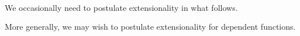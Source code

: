 \begin{fence}
\begin{code}%
\>[0]\AgdaSpace{}%
\AgdaSymbol{:}\AgdaSpace{}%
\AgdaSpace{}%
\AgdaSpace{}%
\AgdaOperator{\AgdaPrimitive{\AgdaUnderscore{}+\AgdaUnderscore{}}}\<%
\\
\>[0]\AgdaSpace{}%
\AgdaSymbol{=}\AgdaSpace{}%
\AgdaSpace{}%
\AgdaSpace{}%
\AgdaSpace{}%
\AgdaSpace{}%
\AgdaSpace{}%
\AgdaSpace{}%
\AgdaSpace{}%
\AgdaSpace{}%
\AgdaSpace{}%
\AgdaSpace{}%
\AgdaSymbol{))}\<%
\end{code}
\end{fence}

We occasionally need to postulate extensionality in what follows.

More generally, we may wish to postulate extensionality for dependent
functions.

\begin{fence}
\begin{code}%
\>[0]\<%
\\
\>[0][@{}l@{\AgdaIndent{0}}]%
\>[2]\AgdaSpace{}%
\AgdaSymbol{:}\AgdaSpace{}%
\AgdaSpace{}%
\AgdaSymbol{\{}\AgdaSpace{}%
\AgdaSymbol{:}\AgdaSpace{}%
\AgdaSymbol{\}}\AgdaSpace{}%
\AgdaSymbol{\{}\AgdaSpace{}%
\AgdaSymbol{:}\AgdaSpace{}%
\AgdaSpace{}%
\AgdaSpace{}%
\AgdaSymbol{\}}\AgdaSpace{}%
\AgdaSymbol{\{}\AgdaSpace{}%
\AgdaSpace{}%
\AgdaSymbol{:}\AgdaSpace{}%
\AgdaSpace{}%
\AgdaSymbol{:}\AgdaSpace{}%
\AgdaSymbol{)}\AgdaSpace{}%
\AgdaSpace{}%
\AgdaSpace{}%
\AgdaSymbol{\}}\<%
\\
\>[2][@{}l@{\AgdaIndent{0}}]%
\>[4]%
\>[201I]\AgdaSpace{}%
\AgdaSymbol{(}\AgdaSpace{}%
\AgdaSymbol{:}\AgdaSpace{}%
\AgdaSymbol{)}\AgdaSpace{}%
\AgdaSpace{}%
\AgdaSpace{}%
\AgdaSpace{}%
\AgdaSpace{}%
\AgdaSpace{}%
\AgdaSymbol{)}\<%
\\
\>[.][@{}l@{}]\<[201I]%
\>[6]\AgdaComment{-----------------------}\<%
\\
%
\>[4]\AgdaSpace{}%
\AgdaSpace{}%
\AgdaSpace{}%
\<%
\end{code}
\end{fence}

